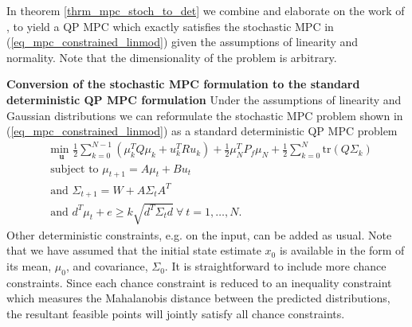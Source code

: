 In theorem \ref{thrm_mpc_stoch_to_det} we combine and elaborate on the work of \cite{yan1}, \cite{vanhessem1} to yield a QP MPC which exactly satisfies the stochastic MPC in (\ref{eq_mpc_constrained_linmod}) given the assumptions of linearity and normality. Note that the dimensionality of the problem is arbitrary.
\begin{thrm}
\textbf{Conversion of the stochastic MPC formulation to the standard deterministic QP MPC formulation} Under the assumptions of linearity and Gaussian distributions we can reformulate the stochastic MPC problem shown in (\ref{eq_mpc_constrained_linmod}) as a standard deterministic QP MPC problem
\begin{equation}
\begin{aligned}
&\underset{\mathbf{u}}{\text{min }} \frac{1}{2}\sum_{k=0}^{N-1} \left( \mu_k^TQ\mu_k + u_k^TRu_k \right) + \frac{1}{2}\mu_N^TP_f\mu_N + \frac{1}{2}\sum_{k=0}^N \text{tr}(Q\Sigma_k) \\
& \text{subject to } \mu_{t+1}=A\mu_t + Bu_t \\
& \text{and } \Sigma_{t+1} = W+A\Sigma_t A^T \\
& \text{and } d^T\mu_t + e \geq k\sqrt{d^T \Sigma_t d} ~\forall ~t=1,\hdots,N.
\end{aligned}
\label{eq_mpc_constrained_linmod_deter}
\end{equation}
\label{thrm_mpc_stoch_to_det}
Other deterministic constraints, e.g. on the input, can be added as usual. Note that we have assumed that the initial state estimate $x_0$ is available in the form of its mean, $\mu_0$,  and covariance, $\Sigma_0$. It is straightforward to include more chance constraints. Since each chance constraint is reduced to an inequality constraint which measures the Mahalanobis distance between the predicted distributions, the resultant feasible points will jointly satisfy all chance constraints.  
\end{thrm}
